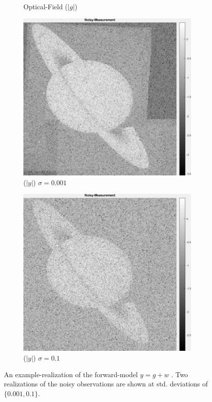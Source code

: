 \documentclass[a4paper, 11pt]{article}
\begin{document}
\begin{figure}[h]
\begin{subfigure}[b]{0.22\textwidth}
        \caption{Optical-Field ($|g|$)}
        \label{fig:opticalField}
    \end{subfigure}
    \begin{subfigure}[b]{0.22\textwidth}
        \includegraphics[width=\textwidth]{../Figures/NoisyMeasurementAmplitudeNoiseSigma1e-3.png}
        \caption{($|y|$) $\sigma=0.001$}
        \label{fig:noisyMeasurement1e-2}
    \end{subfigure}
    \begin{subfigure}[b]{0.22\textwidth}
        \includegraphics[width=\textwidth]{../Figures/NoisyMeasurementAmplitudeNoiseSigma1e-1.png}
        \caption{($|y|$) $\sigma=0.1$}
        \label{fig:noisyMeasurement1e-1}
    \end{subfigure}
\caption{An example-realization of the forward-model $y=g+w$ . Two realizations of the noisy observations are shown at std. deviations of $\{0.001, 0.1\}$.}
\label{fig:forwardModel}
\end{figure}
\end{document}

